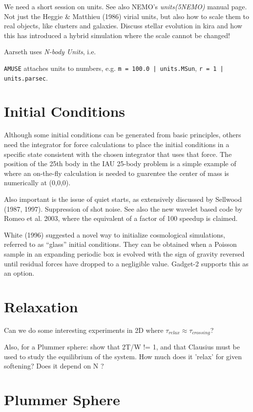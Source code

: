 {We need a short session on units. See also NEMO's {\it units(5NEMO)} manual page.
Not just the Heggie \& Matthieu (1986) virial units, but also how to scale them to
real objects, like clusters and galaxies. Discuss stellar evolution in kira
and how this has introduced a hybrid simulation where the scale cannot be
changed!

Aarseth uses {\it N-body Units}, i.e.

{\tt AMUSE} attaches units to numbers, e.g. {\tt m = 100.0 | units.MSun},
{\tt r = 1 | units.parsec}.

\section{Initial Conditions}

Although some initial conditions can be generated from basic principles,
others need the
integrator for force calculations to place the initial conditions in a
specific state consistent with the chosen integrator that uses that force. 
The position of the 25th
body in the IAU 25-body problem is a simple 
example of where an on-the-fly calculation
is needed to guarentee the center of mass is numerically at (0,0,0).

Also important is the issue of quiet starts, as extensively
discussed by Sellwood (1987, 1997). Suppression of shot noise.
See also the new wavelet based code by Romeo et al. 2003, where the
equivalent of a factor of 100 speedup is claimed.

White (1996) suggested a novel way to initialize cosmological simulations,
referred to as ``glass'' initial conditions. They can be obtained when
a Poisson sample in an expanding periodic box is evolved with the
sign of gravity reversed until residual forces have dropped to a negligible
value. Gadget-2 supports this as an option.


\section{Relaxation}

Can we do some interesting experiments in 2D where $\tau_{relax} \approx \tau_{crossing}$?


Also, for a Plummer sphere: show that 2T/W != 1, and that Clausius must be used to study
the equilibrium of the system. How much does it 'relax' for given softening?
Does it depend on N ?


\section{Plummer Sphere}

}
